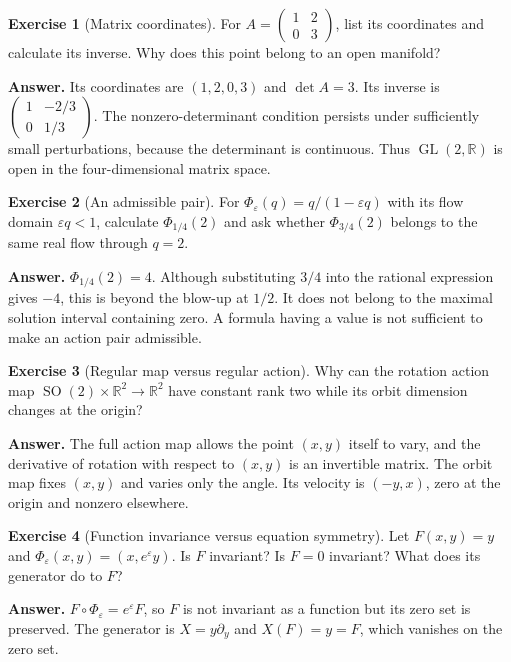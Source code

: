 \documentclass[11pt,a4paper]{article}
\numberwithin{equation}{section}
\theoremstyle{definition}
\newtheorem{exercise}{Exercise}[section]
\theoremstyle{plain}
\theoremstyle{remark}
\newcommand{\R}{\mathbb R}
\newcommand{\GL}{\operatorname{GL}}
\newcommand{\SO}{\operatorname{SO}}
\begin{document}
\begin{exercise}[Matrix coordinates]
For $A=\left(\begin{smallmatrix}1&2\\0&3\end{smallmatrix}\right)$, list its coordinates and calculate its inverse. Why does this point belong to an open manifold?
\end{exercise}
\textbf{Answer.} Its coordinates are $(1,2,0,3)$ and $\det A=3$. Its inverse is $\left(\begin{smallmatrix}1&-2/3\\0&1/3\end{smallmatrix}\right)$. The nonzero-determinant condition persists under sufficiently small perturbations, because the determinant is continuous. Thus $\GL(2,\R)$ is open in the four-dimensional matrix space.

\begin{exercise}[An admissible pair]
For $\Phi_\varepsilon(q)=q/(1-\varepsilon q)$ with its flow domain $\varepsilon q<1$, calculate $\Phi_{1/4}(2)$ and ask whether $\Phi_{3/4}(2)$ belongs to the same real flow through $q=2$.
\end{exercise}
\textbf{Answer.} $\Phi_{1/4}(2)=4$. Although substituting $3/4$ into the rational expression gives $-4$, this is beyond the blow-up at $1/2$. It does not belong to the maximal solution interval containing zero. A formula having a value is not sufficient to make an action pair admissible.

\begin{exercise}[Regular map versus regular action]
Why can the rotation action map $\SO(2)\times\R^2\to\R^2$ have constant rank two while its orbit dimension changes at the origin?
\end{exercise}
\textbf{Answer.} The full action map allows the point $(x,y)$ itself to vary, and the derivative of rotation with respect to $(x,y)$ is an invertible matrix. The orbit map fixes $(x,y)$ and varies only the angle. Its velocity is $(-y,x)$, zero at the origin and nonzero elsewhere.

\begin{exercise}[Function invariance versus equation symmetry]
Let $F(x,y)=y$ and $\Phi_\varepsilon(x,y)=(x,e^\varepsilon y)$. Is $F$ invariant? Is $F=0$ invariant? What does its generator do to $F$?
\end{exercise}
\textbf{Answer.} $F\circ\Phi_\varepsilon=e^\varepsilon F$, so $F$ is not invariant as a function but its zero set is preserved. The generator is $X=y\partial_y$ and $X(F)=y=F$, which vanishes on the zero set.
\end{document}
